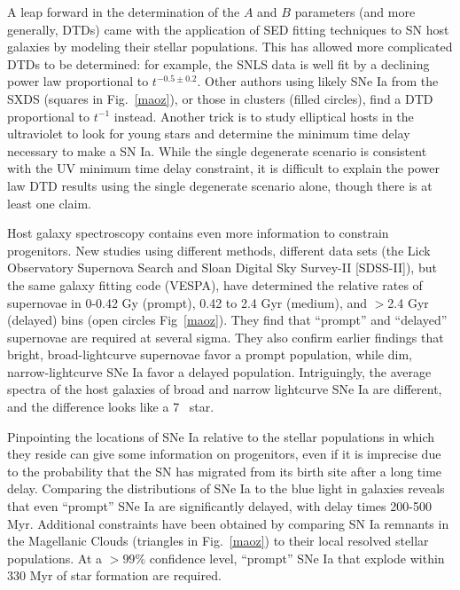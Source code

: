 \documentclass{nature1}
\begin{document}
A leap forward in the determination of the $A$ and $B$ parameters (and
more generally, DTDs) came with the application of SED fitting
techniques to SN host galaxies by modeling their stellar
populations\citep{2006ApJ...648..868S}.  This has allowed more
complicated DTDs to be determined: for example, the SNLS data is well
fit\citep{2008ApJ...683L..25P} by a declining power law proportional
to $t^{-0.5\pm 0.2}$.  Other authors using likely SNe Ia from the
SXDS\citep{2008PASJ...60.1327T} (squares in Fig.~\ref{maoz}), or those in
clusters\citep{2010ApJ...722.1879M} (filled circles), find a DTD proportional to
$t^{-1}$ instead.  Another trick is to study
elliptical hosts in the ultraviolet to look for young stars and
determine the minimum time delay necessary to make a SN
Ia\citep{2009MNRAS.397..717S}.  While the single degenerate scenario
is consistent with the UV minimum time delay constraint, it is
difficult to explain the power law DTD results using the single
degenerate scenario
alone\citep{2005A&A...441.1055G,2008ApJ...683L..25P,2008PASJ...60.1327T},
though there is at least one claim\citep{2008ApJ...679.1390H}.

Host galaxy spectroscopy contains even more information to constrain
progenitors.  New studies using different
methods, different data sets (the Lick Observatory Supernova
Search\citep{2010arXiv1002.3056M} and
Sloan Digital Sky Survey-II [SDSS-II\citep{2010AJ....140..804B}]), but the same galaxy fitting code
(VESPA), have determined the relative rates of supernovae in 0-0.42 Gy
(prompt), 0.42 to 2.4 Gyr (medium), and $>$2.4 Gyr (delayed) bins
(open circles Fig~\ref{maoz}).  They find that ``prompt'' and ``delayed''
supernovae are required at several sigma.  They also confirm earlier
findings that bright, broad-lightcurve supernovae favor a prompt
population, while dim, narrow-lightcurve SNe Ia favor a delayed
population.  Intriguingly, the average spectra of the host galaxies of
broad and narrow lightcurve SNe Ia are different, and the difference
looks like a 7 \Msun\ star\citep{2010AJ....140..804B}.

Pinpointing the locations of SNe Ia relative to the stellar
populations in which they reside can give some information on
progenitors, even if it is imprecise due to the probability that the
SN has migrated from its birth site after a long time delay.
Comparing the distributions of SNe Ia to the blue light in galaxies
reveals that even ``prompt'' SNe Ia are significantly delayed, with
delay times 200-500 Myr\citep{2009ApJ...707...74R}.  Additional
constraints have been obtained by comparing SN Ia remnants in the
Magellanic Clouds (triangles in Fig.~\ref{maoz}) to their local
resolved stellar populations\citep{2010MNRAS.407.1314M}.  At a $>99\%$
confidence level, ``prompt'' SNe Ia that explode within 330 Myr of
star formation are required.
\end{document}
